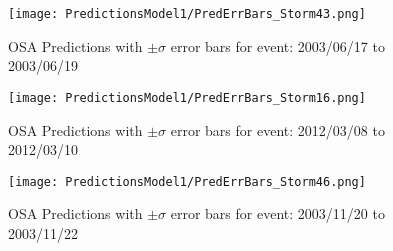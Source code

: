 %



    
\begin{figure}
    \noindent\texttt{[image: PredictionsModel1/PredErrBars\_Storm43.png]}
    \caption{OSA Predictions with $\pm \sigma$ error bars for event: 2003/06/17 to 2003/06/19}
    \label{fig:ComparePred1}
\end{figure}
    
    
\begin{figure}
    \noindent\texttt{[image: PredictionsModel1/PredErrBars\_Storm16.png]}
    \caption{OSA Predictions with $\pm \sigma$ error bars for event: 2012/03/08 to 2012/03/10}
    \label{fig:ComparePred2}
\end{figure}
    
\begin{figure}
    \noindent\texttt{[image: PredictionsModel1/PredErrBars\_Storm46.png]}
    \caption{OSA Predictions with $\pm \sigma$ error bars for event: 2003/11/20 to 2003/11/22}
    \label{fig:ComparePred3}
\end{figure}
    
    
    
    
    
